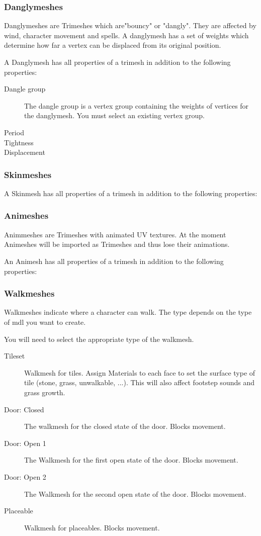 \subsubsection{Danglymeshes}
Danglymeshes are Trimeshes which are"bouncy" or "dangly". They are affected by
wind, character movement and spells. A danglymesh has a set of weights which
determine how far a vertex can be displaced from its original position.

A Danglymesh has all properties of a trimesh in addition to the following
properties:
\begin{description}
    \item[Dangle group] The dangle group is a vertex group containing the weights of vertices for the danglymesh. You must select an existing vertex group.
    \item[Period]
    \item[Tightness]
    \item[Displacement]
\end{description}

\subsubsection{Skinmeshes}
A Skinmesh has all properties of a trimesh in addition to the following
properties:

\subsubsection{Animeshes}
Animmeshes are Trimeshes with animated UV textures. At the moment Animeshes
will be imported as Trimeshes and thus lose their animations.

An Animesh has all properties of a trimesh in addition to the following
properties:

\subsubsection{Walkmeshes}
Walkmeshes indicate where a character can walk. The type depends on the type
of mdl you want to create.

You will need to select the appropriate type of the walkmesh.
\begin{description}
    \item[Tileset] Walkmesh for tiles. Assign Materials to each face to set the
                   surface type of tile (stone, grass, unwalkable, ...).
                   This will also affect footstep sounds and grass growth.
    \item[Door: Closed] The walkmesh for the closed state of the door. Blocks movement.
    \item[Door: Open 1] The Walkmesh for the first open state of the door. Blocks movement.
    \item[Door: Open 2] The Walkmesh for the second open state of the door. Blocks movement.
    \item[Placeable] Walkmesh for placeables. Blocks movement.
\end{description}


